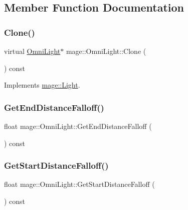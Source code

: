 \subsection{Member Function Documentation}
\hypertarget{classmage_1_1_omni_light_a43f53b59b022ca6ab2d8b7646e644e15}{}\label{classmage_1_1_omni_light_a43f53b59b022ca6ab2d8b7646e644e15} 
\subsubsection{\texorpdfstring{Clone()}{Clone()}}
{\footnotesize\ttfamily virtual \hyperlink{classmage_1_1_omni_light}{Omni\+Light}$\ast$ mage\+::\+Omni\+Light\+::\+Clone (\begin{DoxyParamCaption}{ }\end{DoxyParamCaption}) const\hspace{0.3cm}{\ttfamily [virtual]}}



Implements \hyperlink{classmage_1_1_light_aada77583072dd108e5cf86257225b768}{mage\+::\+Light}.

\hypertarget{classmage_1_1_omni_light_ac3a8638331aa35ffd8967ccc78ca2df7}{}\label{classmage_1_1_omni_light_ac3a8638331aa35ffd8967ccc78ca2df7} 
\subsubsection{\texorpdfstring{Get\+End\+Distance\+Falloff()}{GetEndDistanceFalloff()}}
{\footnotesize\ttfamily float mage\+::\+Omni\+Light\+::\+Get\+End\+Distance\+Falloff (\begin{DoxyParamCaption}{ }\end{DoxyParamCaption}) const}

\hypertarget{classmage_1_1_omni_light_ab37a3e3880f519f40f9c9eaa786ba769}{}\label{classmage_1_1_omni_light_ab37a3e3880f519f40f9c9eaa786ba769} 
\subsubsection{\texorpdfstring{Get\+Start\+Distance\+Falloff()}{GetStartDistanceFalloff()}}
{\footnotesize\ttfamily float mage\+::\+Omni\+Light\+::\+Get\+Start\+Distance\+Falloff (\begin{DoxyParamCaption}{ }\end{DoxyParamCaption}) const}

